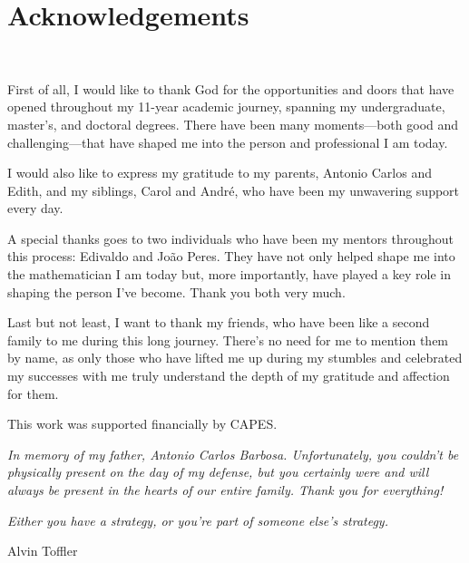 \documentclass[12pt,oneside]{book}
\begin{document}
    \newpage
    \chapter*{Acknowledgements}
    \thispagestyle{empty}
    \

    First of all, I would like to thank God for the opportunities and doors that have opened throughout 
    my 11-year academic journey, spanning my undergraduate, master’s, and doctoral degrees. There have 
    been many moments—both good and challenging—that have shaped me into the person and professional I 
    am today.

    I would also like to express my gratitude to my parents, Antonio Carlos and Edith, and my siblings, 
    Carol and André, who have been my unwavering support every day.

    A special thanks goes to two individuals who have been my mentors throughout this process: Edivaldo 
    and João Peres. They have not only helped shape me into the mathematician I am today but, more 
    importantly, have played a key role in shaping the person I’ve become. Thank you both very much.

    Last but not least, I want to thank my friends, who have been like a second family to me during this 
    long journey. There’s no need for me to mention them by name, as only those who have lifted me up 
    during my stumbles and celebrated my successes with me truly understand the depth of my gratitude 
    and affection for them.

    This work was supported financially by CAPES.



    \vspace{2cm}

    \begin{center}
        \begin{minipage}{10cm}
            \textit{In memory of my father, Antonio Carlos Barbosa. Unfortunately, you couldn't be 
            physically present on the day of my defense, but you certainly were and will always be 
            present in the hearts of our entire family. Thank you for everything!}
        \end{minipage}
    \end{center}



    \newpage
    \thispagestyle{empty}

    \begin{flushright}
        \begin{minipage}{7cm}
            \begin{flushright}
                \vspace{22cm}\textit{Either you have a strategy, or you're part of someone else's 
                strategy.}

                \vspace{0.2cm} Alvin Toffler
            \end{flushright}
        \end{minipage}
    \end{flushright}
\end{document}
